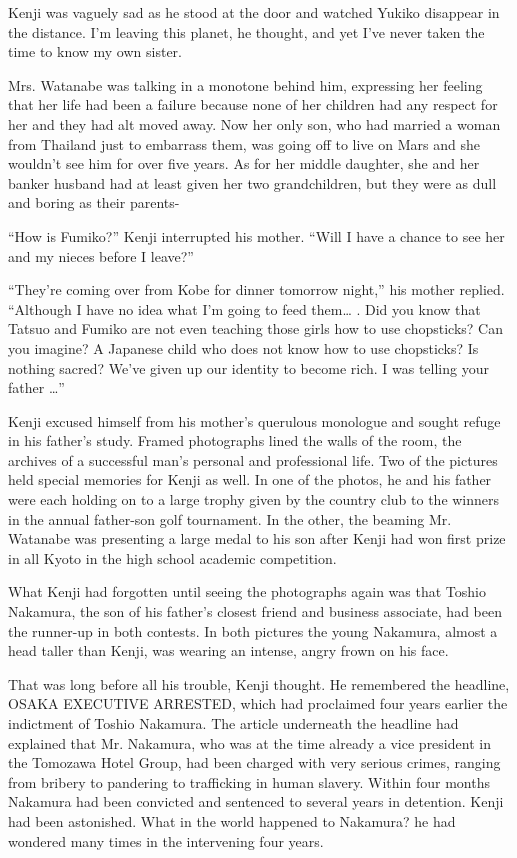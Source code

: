 \documentclass[]{article}
\begin{document}
{Kenji was vaguely sad as he stood at the door and watched Yukiko disappear in the distance.  I’m leaving this planet, he thought, and yet I’ve never taken the time to know my own sister.

Mrs.  Watanabe was talking in a monotone behind him, expressing her feeling that her life had been a failure because none of her children had any respect for her and they had alt moved away.  Now her only son, who had married a woman from Thailand just to embarrass them, was going off to live on Mars and she wouldn’t see him for over five years.  As for her middle daughter, she and her banker husband had at least given her two grandchildren, but they were as dull and boring as their parents-

“How is Fumiko?” Kenji interrupted his mother.  “Will I have a chance to see her and my nieces before I leave?”

“They’re coming over from Kobe for dinner tomorrow night,” his mother replied.  “Although I have no idea what I’m going to feed them… .  Did you know that Tatsuo and Fumiko are not even teaching those girls how to use chopsticks? Can you imagine? A Japanese child who does not know how to use chopsticks? Is nothing sacred? We’ve given up our identity to become rich.  I was telling your father …”

Kenji excused himself from his mother’s querulous monologue and sought refuge in his father’s study.  Framed photographs lined the walls of the room, the archives of a successful man’s personal and professional life.  Two of the pictures held special memories for Kenji as well.  In one of the photos, he and his father were each holding on to a large trophy given by the country club to the winners in the annual father-son golf tournament.  In the other, the beaming Mr.  Watanabe was presenting a large medal to his son after Kenji had won first prize in all Kyoto in the high school academic competition.

What Kenji had forgotten until seeing the photographs again was that Toshio Nakamura, the son of his father’s closest friend and business associate, had been the runner-up in both contests.  In both pictures the young Nakamura, almost a head taller than Kenji, was wearing an intense, angry frown on his face.

That was long before all his trouble, Kenji thought.  He remembered the headline, OSAKA EXECUTIVE ARRESTED, which had proclaimed four years earlier the indictment of Toshio Nakamura.  The article underneath the headline had explained that Mr.  Nakamura, who was at the time already a vice president in the Tomozawa Hotel Group, had been charged with very serious crimes, ranging from bribery to pandering to trafficking in human slavery.  Within four months Nakamura had been convicted and sentenced to several years in detention.  Kenji had been astonished.  What in the world happened to Nakamura? he had wondered many times in the intervening four years.

}
\end{document}
